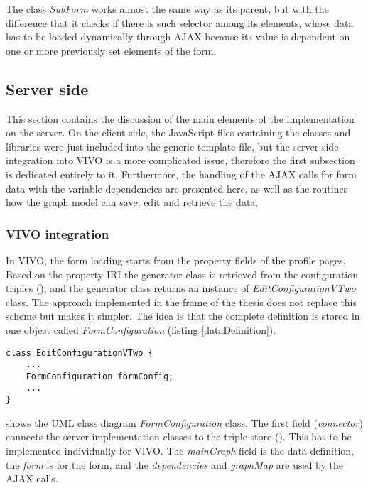 The class \textit{SubForm} works almost the same way as its parent, but with the difference that it checks if there is such selector among its elements, whose data has to be loaded dynamically through AJAX because its value is dependent on one or more previously set elements of the form.  

\newpage
\subsection{Server side} 

This section contains the discussion of the main elements of the implementation on the server. On the client side, the JavaScript files containing the classes and libraries were just included into the generic template file, but the server side integration into VIVO is a more complicated issue, therefore the first subsection is dedicated entirely to it. Furthermore, the handling of the AJAX calls for form data with the variable dependencies are presented here, as well as the routines how the graph model can save, edit and retrieve the data.

\subsubsection{VIVO integration}

In VIVO, the form loading starts from the property fields of the profile pages,  Based on the property IRI the generator class is retrieved from the configuration triples (), and the generator class returns an instance of \textit{EditConfigurationVTwo} class. The approach implemented in the frame of the thesis does not replace this scheme but makes it simpler. The idea is that the complete definition is stored in one object called \textit{FormConfiguration} (listing \ref{dataDefinition}).

\begin{lstlisting}[basicstyle=\footnotesize, frame=single, caption={Added field to the VIVO configuration class}, label=dataDefinition, captionpos=b, belowskip=1em, aboveskip=2em]
class EditConfigurationVTwo {
	...
	FormConfiguration formConfig;
	...
}
\end{lstlisting}

 shows the UML class diagram \textit{FormConfiguration} class. The first field (\textit{connector}) connects the server implementation classes to the triple store (). This has to be implemented individually for VIVO. The \textit{mainGraph} field is the data definition, the \textit{form} is for the form, and the \textit{dependencies} and \textit{graphMap} are used by the AJAX calls. 

